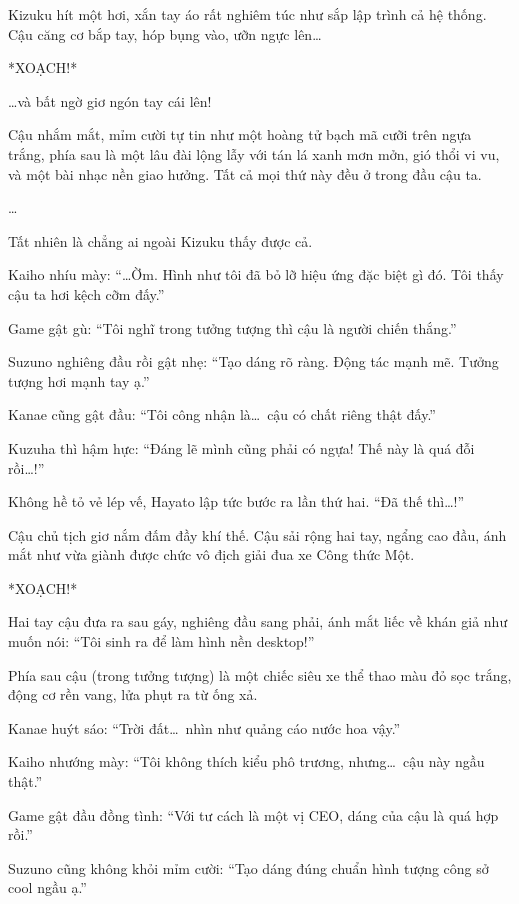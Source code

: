 \documentclass[../main.tex]{subfiles}
\begin{document}
Kizuku hít một hơi, xắn tay áo rất nghiêm túc như sắp lập trình cả hệ thống. Cậu căng cơ bắp tay, hóp bụng vào, ưỡn ngực lên\dots

*XOẠCH!*


\dots và bất ngờ giơ ngón tay cái lên!

Cậu nhắm mắt, mỉm cười tự tin như một hoàng tử bạch mã cưỡi trên ngựa trắng, phía sau là một lâu đài lộng lẫy với tán lá xanh mơn mởn, gió thổi vi vu, và một bài nhạc nền giao hưởng. Tất cả mọi thứ này đều ở trong đầu cậu ta.

\dots

Tất nhiên là chẳng ai ngoài Kizuku thấy được cả.

Kaiho nhíu mày: ``\dots Ờm. Hình như tôi đã bỏ lỡ hiệu ứng đặc biệt gì đó. Tôi thấy cậu ta hơi kệch cỡm đấy.''

Game gật gù: ``Tôi nghĩ trong tưởng tượng thì cậu là người chiến thắng.''

Suzuno nghiêng đầu rồi gật nhẹ: ``Tạo dáng rõ ràng. Động tác mạnh mẽ. Tưởng tượng hơi mạnh tay ạ.''

Kanae cũng gật đầu: ``Tôi công nhận là\dots\ cậu có chất riêng thật đấy.''

Kuzuha thì hậm hực: ``Đáng lẽ mình cũng phải có ngựa! Thế này là quá đỗi rồi\dots!''

\ct

Không hề tỏ vẻ lép vế, Hayato lập tức bước ra lần thứ hai. ``Đã thế thì\dots!''

Cậu chủ tịch giơ nắm đấm đầy khí thế. Cậu sải rộng hai tay, ngẩng cao đầu, ánh mắt như vừa giành được chức vô địch giải đua xe Công thức Một.

*XOẠCH!*


Hai tay cậu đưa ra sau gáy, nghiêng đầu sang phải, ánh mắt liếc về khán giả như muốn nói: ``Tôi sinh ra để làm hình nền desktop!''

Phía sau cậu (trong tưởng tượng) là một chiếc siêu xe thể thao màu đỏ sọc trắng, động cơ rền vang, lửa phụt ra từ ống xả.

Kanae huýt sáo: ``Trời đất\dots\ nhìn như quảng cáo nước hoa vậy.''

Kaiho nhướng mày: ``Tôi không thích kiểu phô trương, nhưng\dots\ cậu này ngầu thật.''

Game gật đầu đồng tình: ``Với tư cách là một vị CEO, dáng của cậu là quá hợp rồi.''

Suzuno cũng không khỏi mỉm cười: ``Tạo dáng đúng chuẩn hình tượng công sở cool ngầu ạ.''
\end{document}
